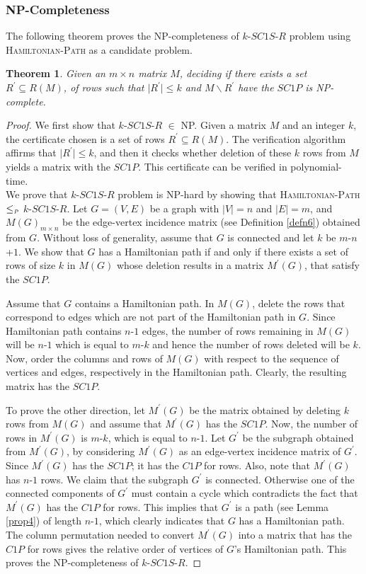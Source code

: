 \documentclass[review, 1p]{elsarticle}
\newtheorem{theorem}{Theorem}
\begin{document}
\subsubsection{\textup{\textbf{NP-Completeness}}}\label{hard1}
The following theorem proves the NP-completeness of $k$-$SC1S$-$R$ problem using \textsc{Hamiltonian-Path} as a candidate problem. 
\begin{theorem}\label{thm14}
Given an $m \times n$ matrix $M$, deciding if there exists a set $R^{'} \subseteq R(M)$, of rows such that $\vert R^{'} \vert \leq k$ and $M \backslash R^{'}$ have the $SC1P$ is NP-complete.
\end{theorem}
\begin{proof}
We first show that $k$-$SC1S$-$R$ $\in$ NP. Given a matrix $M$ and an integer $k$, the certificate chosen is a set of rows $R^{'} \subseteq R(M)$. The verification algorithm affirms that $\vert R^{'} \vert \leq k $, and then it checks  whether deletion of these $k$ rows from $M$ yields a matrix with the $SC1P$. This certificate can be verified in polynomial-time.\\
\indent We prove that $k$-$SC1S$-$R$ problem is NP-hard by showing that \textsc{Hamiltonian-Path} $\leq_{\mathsmaller {P}}$  $k$-$SC1S$-$R$. Let $G=(V,E)$ be a graph with $\vert V \vert = n$ and $\vert E \vert =m$, and $M(G)_{m \times n}$ be the edge-vertex incidence matrix (see Definition \ref{defn6}) obtained from $G$. Without loss of generality, assume that $G$ is connected and let $k$ be $m$-$n$+$1$. We show that $G$ has a Hamiltonian path if and only if there exists a set of rows of size $k$ in $M(G)$ whose deletion results in a matrix $M^{'}(G)$, that satisfy the $SC1P$.

Assume that $G$ contains a Hamiltonian path. In $M(G)$, delete the rows that correspond to edges which are not part of the Hamiltonian path in $G$. Since Hamiltonian path contains $n$-$1$ edges, the number of rows remaining in $M(G)$ will be $n$-$1$ which is equal to $m$-$k$ and hence the number of rows deleted will be $k$. Now, order the columns and rows of $M(G)$ with respect to the sequence of  vertices and edges, respectively in the Hamiltonian path. Clearly, the resulting matrix has the $SC1P$.

To prove the other direction, let $M^{'}(G)$ be the matrix obtained by deleting $k$ rows from $M(G)$ and assume that $M^{'}(G)$ has the $SC1P$. Now, the number of rows in $M^{'}(G)$ is  $m$-$k$, which is equal to $n$-$1$. Let $G^{'}$ be the subgraph obtained from $M^{'}(G)$, by considering $M^{'}(G)$ as an edge-vertex incidence matrix of $G^{'}$. Since $M^{'}(G)$ has the $SC1P$; it has the $C1P$ for rows. Also, note that $M^{'}(G)$ has $n$-$1$ rows. We claim that the subgraph $G^{'}$ is connected. Otherwise one of the connected components of $G^{'}$ must contain a cycle which contradicts the fact that $M^{'}(G)$ has the $C1P$ for rows. This implies that $G^{'}$ is a path (see Lemma \ref{prop4}) of length $n$-$1$, which clearly indicates that $G$ has a Hamiltonian path. The column permutation needed to convert $M^{'}(G)$ into a matrix that has the $C1P$ for rows gives the relative order of vertices of $G$'s Hamiltonian path.
 This proves the NP-completeness of $k$-$SC1S$-$R$. 
\end{proof}
\end{document}
